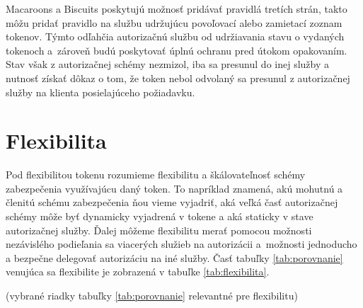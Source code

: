Macaroons a Biscuits poskytujú možnosť pridávať pravidlá tretích strán, takto môžu pridať pravidlo na službu udržujúcu povoľovací alebo zamietací zoznam tokenov. Týmto odľahčia autorizačnú službu od udržiavania stavu o vydaných tokenoch a~zároveň budú poskytovať úplnú ochranu pred útokom opakovaním. Stav však z autorizačnej schémy nezmizol, iba sa presunul do inej služby a nutnosť získať dôkaz o tom, že token nebol odvolaný sa presunul z autorizačnej služby na klienta posielajúceho požiadavku.


\section{Flexibilita}

Pod flexibilitou tokenu rozumieme flexibilitu a škálovateľnosť schémy zabezpečenia využívajúcu daný token. To napríklad znamená, akú mohutnú a členitú schému zabezpečenia ňou vieme vyjadriť, aká veľká časť autorizačnej schémy môže byť dynamicky vyjadrená v tokene a aká staticky v stave autorizačnej služby. Ďalej môžeme flexibilitu merať pomocou možnosti nezávislého podieľania sa viacerých služieb na autorizácii a~možnosti jednoducho a bezpečne delegovať autorizáciu na iné služby. Časť tabuľky \ref{tab:porovnanie} venujúca sa flexibilite je zobrazená v tabuľke \ref{tab:flexibilita}.

\begin{table}
  \begin{center}
    \caption{Flexibilita tokenov}(vybrané riadky tabuľky \ref{tab:porovnanie} relevantné pre flexibilitu)
    \label{tab:flexibilita} %

  \end{center}
\end{table}

